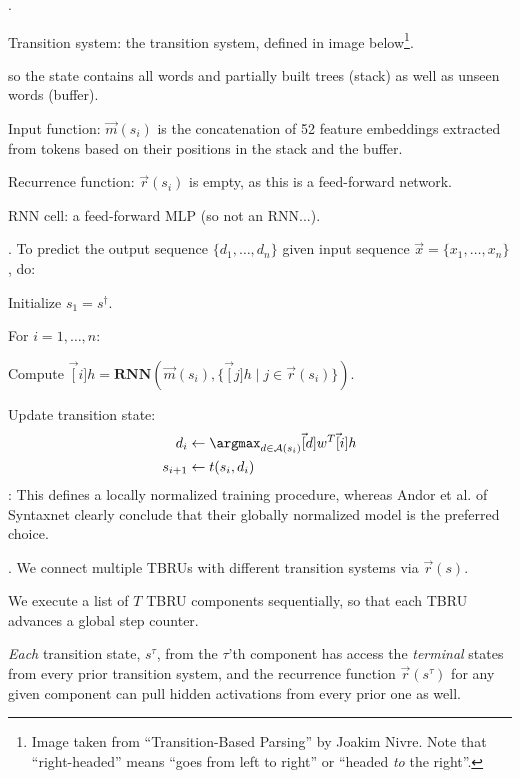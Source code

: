 \documentclass[11pt]{article}
\begin{document}
\myspace
\p {}. 
\begin{compactitem}
	\item Transition system: the  transition system, defined in image below\footnote{Image taken from ``Transition-Based Parsing'' by Joakim Nivre. Note that ``right-headed'' means ``goes from left to right'' or ``headed \textit{to} the right''.}. 
	
	so the state contains all words and partially built trees (stack) as well as unseen words (buffer). 
	
	\item Input function: $\vec{m}(s_i)$ is the concatenation of 52 feature embeddings extracted from tokens based on their positions in the stack and the buffer.
	\item Recurrence function: $\vec{r}(s_i)$ is empty, as this is a feed-forward network. 
	\item RNN cell: a feed-forward MLP (so not an RNN...). 
\end{compactitem}

\myspace
\p {}. To predict the output sequence $\{d_1, \ldots, d_n\}$ given input sequence $\vec{x} = \{x_1, \ldots, x_n\}$, do:
\begin{compactenum}
	\item Initialize $s_1 = s^{\dagger}$. 
	\item For $i = 1, \ldots, n$:
	\begin{compactenum}
		\item Compute $\vec[i]{h} = \mathbf{RNN}(\vec{m}(s_i), \{  \vec[j]{h} \mid j \in \vec{r}(s_i)    \}  )$. 
		
		\item Update transition state:
		\begin{align}
		d_i &\leftarrow \argmax_{d \in \mathcal{A}(s_i)} \vec[d]{w}^T \vec[i]{h} \\
		s_{i+1} &\leftarrow t(s_i, d_i)
		\end{align}
		: This defines a locally normalized training procedure, whereas Andor et al. of Syntaxnet clearly conclude that their globally normalized model is the preferred choice.
	\end{compactenum}
\end{compactenum}


\myspace
\p {}. We connect multiple TBRUs with different transition systems via $\vec{r}(s)$. 
\begin{compactenum}
	\item We execute a list of $T$ TBRU components sequentially, so that each TBRU advances a global step counter.
	\item \textit{Each} transition state, $s^{\tau}$, from the $\tau$'th component has access the \textit{terminal} states from every prior transition system, and the recurrence function $\vec{r}(s^{\tau})$ for any given component can pull hidden activations from every prior one as well.
\end{compactenum}
\end{document}
